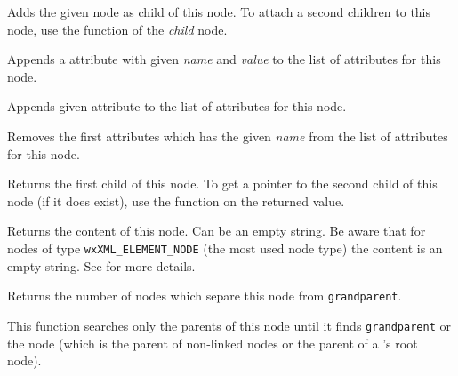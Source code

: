 Adds the given node as child of this node. To attach a second children to this node, use the
 function of the {\it child} node.

\label{wxxmlnodeaddattribute}


Appends a attribute with given {\it name} and {\it value} to the list of attributes for this node.


Appends given attribute to the list of attributes for this node.

\label{wxxmlnodedeleteattribute}


Removes the first attributes which has the given {\it name} from the list of attributes for this node.

\label{wxxmlnodegetchildren}


Returns the first child of this node.
To get a pointer to the second child of this node (if it does exist), use the
 function on the returned value.

\label{wxxmlnodegetcontent}


Returns the content of this node. Can be an empty string.
Be aware that for nodes of type \texttt{wxXML\_ELEMENT\_NODE} (the most used node type) the
content is an empty string. See  for more details.


\label{wxxmlnodegetdepth}


Returns the number of nodes which separe this node from {\tt grandparent}.

This function searches only the parents of this node until it finds {\tt grandparent}
or the \NULL node (which is the parent of non-linked nodes or the parent of a
's root node).


